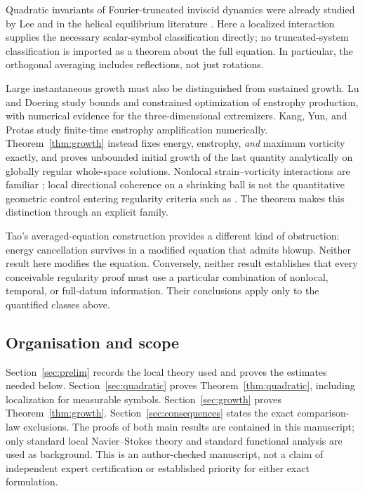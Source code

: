 \documentclass[11pt]{article}
\theoremstyle{remark}
\begin{document}
Quadratic invariants of Fourier-truncated inviscid dynamics were already
studied by Lee \cite{Lee} and in the helical equilibrium literature
\cite{Kraichnan}. Here a localized interaction supplies the necessary
scalar-symbol classification directly; no truncated-system classification
is imported as a theorem about the full equation. In particular, the
orthogonal averaging includes reflections, not just rotations.

Large instantaneous growth must also be distinguished from sustained
growth. Lu and Doering \cite{LD} study bounds and constrained optimization
of enstrophy production, with numerical evidence for the three-dimensional
extremizers. Kang, Yun, and Protas \cite{KYP} study finite-time enstrophy
amplification numerically. Theorem~\ref{thm:growth} instead fixes energy,
enstrophy, \emph{and} maximum vorticity exactly, and proves unbounded initial
growth of the last quantity analytically on globally regular whole-space
solutions. Nonlocal strain--vorticity interactions are familiar
\cite{BPB}; local directional coherence on a shrinking ball is not the
quantitative geometric control entering regularity criteria such as
\cite{CF}. The theorem makes this distinction through an explicit family.

Tao's averaged-equation construction \cite{TaoAveraged} provides a different
kind of obstruction: energy cancellation survives in a modified equation
that admits blowup. Neither result here modifies the equation. Conversely,
neither result establishes that every conceivable regularity proof must
use a particular combination of nonlocal, temporal, or full-datum
information. Their conclusions apply only to the quantified classes above.

\subsection{Organisation and scope}
Section~\ref{sec:prelim} records the local theory used and proves the
estimates needed below. Section~\ref{sec:quadratic} proves
Theorem~\ref{thm:quadratic}, including localization for measurable symbols.
Section~\ref{sec:growth} proves Theorem~\ref{thm:growth}.
Section~\ref{sec:consequences} states the exact comparison-law exclusions.
The proofs of both main results are contained in this manuscript; only
standard local Navier--Stokes theory and standard functional analysis are
used as background. This is an author-checked manuscript, not a claim of
independent expert certification or established priority for either exact
formulation.
\end{document}
